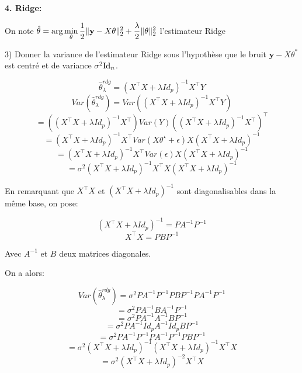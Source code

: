 \vspace{5mm}

{\fontsize{12pt}{22pt} \textbf{4. Ridge:}\par}

\vspace{5mm}

On note $\hat \theta = {\rm arg} \displaystyle\min_{\theta} \frac{1}{2}\| \mathbf{y} -X \theta \|_2^2+ \frac{\lambda}{2}\|\theta\|_2^2$ l’estimateur Ridge

3) Donner la variance de l'estimateur Ridge sous l’hypothèse que le bruit $\mathbf{y} -X \theta^*$ est centré et de variance $\sigma^2 {\rm Id}_n$.

$$\hat \theta_{\lambda}^{rdg} = (X^\top X+\lambda Id_p)^{-1}X^\top Y$$
$$Var(\hat \theta_{\lambda}^{rdg}) = Var((X^\top X+\lambda Id_p)^{-1}X^\top Y)$$ 
$$ = ((X^\top X+\lambda Id_p)^{-1}X^\top) Var(Y) ((X^\top X+\lambda Id_p)^{-1}X^\top)^\top$$ 
$$ = (X^\top X+\lambda Id_p)^{-1}X^\top Var(X \theta^\star + \epsilon)X(X^\top X+\lambda Id_p)^{-1}$$ 
$$ = (X^\top X+\lambda Id_p)^{-1}X^\top Var(\epsilon)X(X^\top X+\lambda Id_p)^{-1}$$ 
$$ = \sigma^2 (X^\top X+\lambda Id_p)^{-1}X^\top X(X^\top X+\lambda Id_p)^{-1}$$ 

En remarquant que $X^\top X$ et $(X^\top X+\lambda Id_p)^{-1}$ sont diagonalisables dans la même base, on pose:

$$(X^\top X+\lambda Id_p)^{-1} = PA^{-1}P^{-1}$$
$$X^\top X = PBP^{-1}$$

Avec $A^{-1}$ et $B$ deux matrices diagonales.

On a alors:

$$Var(\hat \theta_{\lambda}^{rdg}) = \sigma^2PA^{-1}P^{-1}PBP^{-1}PA^{-1}P^{-1}$$
$$ = \sigma^2PA^{-1}BA^{-1}P^{-1}$$
$$ = \sigma^2PA^{-1}A^{-1}BP^{-1}$$
$$ = \sigma^2PA^{-1}Id_pA^{-1}Id_pBP^{-1}$$
$$ = \sigma^2PA^{-1}P^{-1}PA^{-1}P^{-1}PBP^{-1}$$
$$ = \sigma^2 (X^\top X+\lambda Id_p)^{-1} (X^\top X+\lambda Id_p)^{-1}X^\top X$$
$$ = \sigma^2 (X^\top X+\lambda Id_p)^{-2} X^\top X$$






